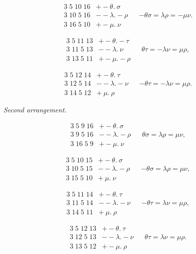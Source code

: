 \documentclass[11pt]{article}
\begin{document}
\begin{align*}
3\;5\;10\;16 & + -\theta.\ \sigma & & \\
3\;10\;5\;16 & - -\lambda.-\rho & & -\theta\sigma = \lambda\rho = -\mu\nu. \\
3\;16\;5\;10 & + -\mu.\ \nu
\end{align*}

\begin{align*}
3\;5\;11\;13 & + -\theta.-\tau & & \\
3\;11\;5\;13 & - -\lambda.\ \nu & & \theta\tau = -\lambda\nu = \mu\rho, \\
3\;13\;5\;11 & + -\mu.-\rho
\end{align*}

\begin{align*}
3\;5\;12\;14 & + -\theta.\ \tau & & \\
3\;12\;5\;14 & - -\lambda.-\nu & & -\theta\tau = -\lambda\nu = \mu\rho. \\
3\;14\;5\;12 & + \ \mu.\ \rho
\end{align*}

\textit{Second arrangement.}

\begin{align*}
3\;5\;9\;16 & + -\theta.\ \sigma & & \\
3\;9\;5\;16 & - -\lambda.-\rho & & \theta\sigma = \lambda\rho = \mu\nu, \\
3\;16\;5\;9 & + -\mu.\ \nu
\end{align*}

\begin{align*}
3\;5\;10\;15 & + -\theta.\ \sigma & & \\
3\;10\;5\;15 & - -\lambda.-\rho & & -\theta\sigma = \lambda\rho = \mu\nu, \\
3\;15\;5\;10 & + \ \mu.\ \nu
\end{align*}

\begin{align*}
3\;5\;11\;14 & + -\theta.\ \tau & & \\
3\;11\;5\;14 & - -\lambda.-\nu & & -\theta\tau = \lambda\nu = \mu\rho, \\
3\;14\;5\;11 & + \ \mu.\ \rho
\end{align*}

\begin{align*}
3\;5\;12\;13 & + -\theta.\ \tau & & \\
3\;12\;5\;13 & - -\lambda.-\nu & & \theta\tau = \lambda\nu = \mu\rho. \\
3\;13\;5\;12 & + -\mu.\ \rho
\end{align*}
\end{document}
